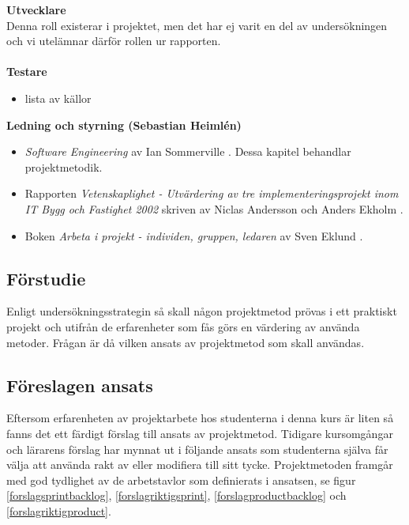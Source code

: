 \documentclass[conference,a4paper]{IEEEtran}
\begin{document}
\noindent \textbf{Utvecklare}\\
\indent Denna roll existerar i projektet, men det har ej varit en del av undersökningen och vi utelämnar därför rollen ur rapporten.\\
\\
\noindent \textbf{Testare}
\begin{itemize}
\item lista av källor
\\
\end{itemize}

\noindent \textbf{Ledning och styrning (Sebastian Heimlén)}
\begin{itemize}
\item \textit{Software Engineering} av Ian Sommerville \cite[kap. 22,23,26]{Sommerville10}. Dessa kapitel behandlar projektmetodik.
\\
\item Rapporten \textit{Vetenskaplighet - Utvärdering av tre implementeringsprojekt inom IT Bygg och Fastighet 2002} skriven av Niclas Andersson och Anders Ekholm \cite{Andersson02}.
\\
\item Boken \textit{Arbeta i projekt - individen, gruppen, ledaren} av Sven Eklund \cite{Eklund14}.
\\
\end{itemize}

\subsection{Förstudie}
Enligt undersökningsstrategin så skall någon projektmetod prövas i ett praktiskt projekt och utifrån de erfarenheter som fås görs en värdering av använda metoder. Frågan är då vilken ansats av projektmetod som skall användas.

\subsection{Föreslagen ansats}
Eftersom erfarenheten av projektarbete hos studenterna i denna kurs är liten så fanns det ett färdigt förslag till ansats av projektmetod. Tidigare kursomgångar och lärarens förslag har mynnat ut i följande ansats som studenterna själva får välja att använda rakt av eller modifiera till sitt tycke. Projektmetoden framgår med god tydlighet av de arbetstavlor som definierats i ansatsen, se figur \ref{forslagsprintbacklog}, \ref{forslagriktigsprint}, \ref{forslagproductbacklog} och \ref{forslagriktigproduct}.
\end{document}
